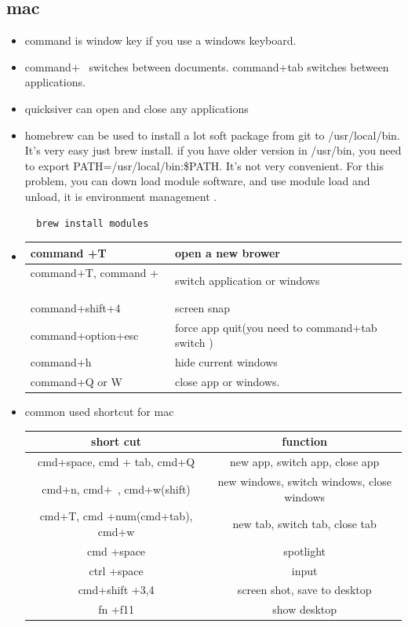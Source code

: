 \documentclass[a4paper,11pt,twoside]{book}
\begin{document}
\subsection{mac}
\begin{itemize}
 \item command is window key if you use a windows keyboard.
 \item command+~ switches between documents. command+tab switches between applications.
  \item quicksiver can open and close any applications
  \item homebrew can be used to install a lot soft package from git to /usr/local/bin. It's very easy just brew install. 
  if you have older version in /usr/bin, you need to export PATH=/usr/local/bin:\$PATH. It's not very convenient. For this problem, you can down load module software, and use module load and unload, it is  environment management . 
  \begin{verbatim}
  brew install modules 
  \end{verbatim}
  
  \item 
  \begin{tabular}{|p{}|p{}|}
  \hline command +T & open a new brower \\
  \hline command+T, command + ~ & switch application or windows \\
  \hline command+shift+4 & screen snap \\
  \hline command+option+esc & force app quit(you need to command+tab switch ) \\
  \hline command+h & hide current windows \\
  \hline command+Q or W & close app or windows. \\
  \end{tabular} 
  
  	\item common used shortcut for mac
  
  \begin{tabular}{|c|c|}
  	\hline
  	short cut& function  \\
  	\hline
  	cmd+space, cmd + tab, cmd+Q& new app,  switch app, close app \\
  	\hline
  	 cmd+n, cmd+~, cmd+w(shift) & new windows, switch windows, close windows \\
  	\hline
  	cmd+T, cmd +num(cmd+tab), cmd+w &new tab,  switch tab, close tab  \\
  	\hline
  	cmd +space& spotlight  \\
  	\hline
  	ctrl +space& input  \\
  	\hline
  	cmd+shift +3,4& screen shot, save to desktop  \\
  	\hline
  	fn +f11& show desktop  \\
  	\hline
  	

\end{tabular}
\end{itemize}
\end{document}
